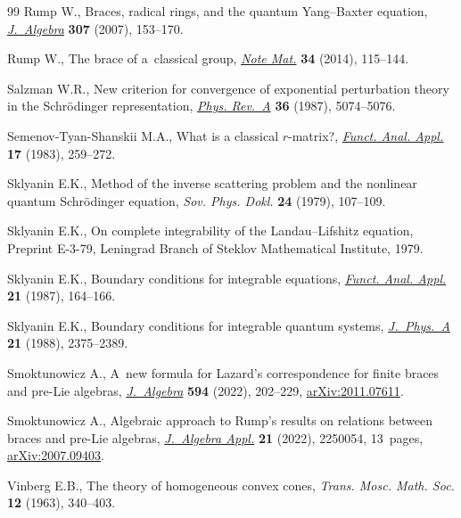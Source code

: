 \begin{thebibliography}{99}
Rump W., Braces, radical rings, and the quantum {Y}ang--{B}axter equation,
 \href{https://doi.org/10.1016/j.jalgebra.2006.03.040}{\textit{J.~Algebra}}
 \textbf{307} (2007), 153--170.

Rump W., The brace of a~classical group,
 \href{https://doi.org/10.1285/i15900932v34n1p115}{\textit{Note Mat.}}
 \textbf{34} (2014), 115--144.

Salzman W.R., New criterion for convergence of exponential perturbation theory
 in the {S}chr\"odinger representation,
 \href{https://doi.org/10.1103/PhysRevA.36.5074}{\textit{Phys. Rev.~A}}
 \textbf{36} (1987), 5074--5076.

Semenov-Tyan-Shanskii M.A., What is a classical $r$-matrix?,
 \href{https://doi.org/10.1007/BF01076717}{\textit{Funct. Anal. Appl.}}
 \textbf{17} (1983), 259--272.


Sklyanin E.K., Method of the inverse scattering problem and the nonlinear
 quantum {S}chr\"odinger equation, \textit{Sov. Phys. Dokl.} \textbf{24}
 (1979), 107--109.

Sklyanin E.K., On complete integrability of the {L}andau--{L}ifshitz equation,
 {P}reprint E-3-79, Leningrad Branch of Steklov Mathematical Institute, 1979.

Sklyanin E.K., Boundary conditions for integrable equations,
 \href{https://doi.org/10.1007/BF01078038}{\textit{Funct. Anal. Appl.}}
 \textbf{21} (1987), 164--166.

Sklyanin E.K., Boundary conditions for integrable quantum systems,
 \href{https://doi.org/10.1088/0305-4470/21/10/015}{\textit{J.~Phys.~A}}
 \textbf{21} (1988), 2375--2389.

Smoktunowicz A., A~new formula for {L}azard's correspondence for finite braces
 and pre-{L}ie algebras,
 \href{https://doi.org/10.1016/j.jalgebra.2021.11.027}{\textit{J.~Algebra}}
 \textbf{594} (2022), 202--229,
 \href{http://arxiv.org/abs/2011.07611}{arXiv:2011.07611}.

Smoktunowicz A., Algebraic approach to {R}ump's results on relations between
 braces and pre-{L}ie algebras,
 \href{https://doi.org/10.1142/S0219498822500542}{\textit{J.~Algebra Appl.}}
 \textbf{21} (2022), 2250054, 13~pages,
 \href{http://arxiv.org/abs/2007.09403}{arXiv:2007.09403}.

Vinberg E.B., The theory of homogeneous convex cones, \textit{Trans. Mosc.
 Math. Soc.} \textbf{12} (1963), 340--403.


\end{thebibliography}
